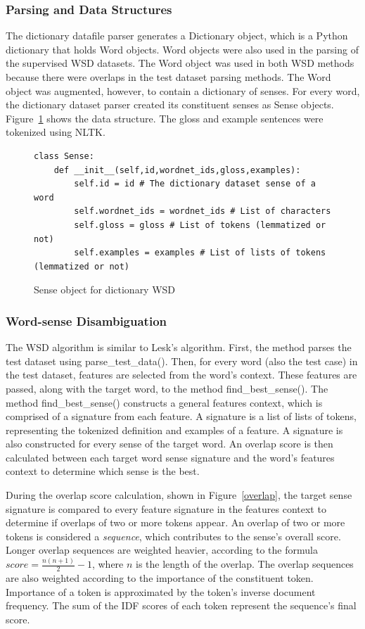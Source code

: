 \documentclass[11pt]{article}
\begin{document}
\subsubsection{Parsing and Data Structures}
The dictionary datafile parser generates a Dictionary object, which is a Python dictionary that holds Word objects. Word objects were also used in the parsing of the supervised WSD datasets. The Word object was used in both WSD methods because there were overlaps in the test dataset parsing methods. The Word object was augmented, however, to contain a dictionary of senses. For every word, the dictionary dataset parser created its constituent senses as Sense objects. Figure~\ref{sense} shows the data structure. The gloss and example sentences were tokenized using NLTK.

\begin{figure}[ht]
\begin{lstlisting}
class Sense:
    def __init__(self,id,wordnet_ids,gloss,examples):
        self.id = id # The dictionary dataset sense of a word
        self.wordnet_ids = wordnet_ids # List of characters
        self.gloss = gloss # List of tokens (lemmatized or not)
        self.examples = examples # List of lists of tokens (lemmatized or not)
\end{lstlisting}
\caption{Sense object for dictionary WSD}
\label{sense}
\end{figure}

\subsubsection{Word-sense Disambiguation}
The WSD algorithm is similar to Lesk's algorithm. First, the method parses the test dataset using parse\_test\_data(). Then, for every word (also the test case) in the test dataset, features are selected from the word's context. These features are passed, along with the target word, to the method find\_best\_sense(). The method find\_best\_sense() constructs a general features context, which is comprised of a signature from each feature. A signature is a list of lists of tokens, representing the tokenized definition and examples of a feature. A signature is also constructed for every sense of the target word. An overlap score is then calculated between each target word sense signature and the word's features context to determine which sense is the best. 

During the overlap score calculation, shown in Figure~\ref{overlap}, the target sense signature is compared to every feature signature in the features context to determine if overlaps of two or more tokens appear. An overlap of two or more tokens is considered a \textit{sequence}, which contributes to the sense's overall score. Longer overlap sequences are weighted heavier, according to the formula $score = \frac{n(n+1)}{2} - 1$, where $n$ is the length of the overlap. The overlap sequences are also weighted according to the importance of the constituent token. Importance of a token is approximated by the token's inverse document frequency. The sum of the IDF scores of each token represent the sequence's final score.
\end{document}
